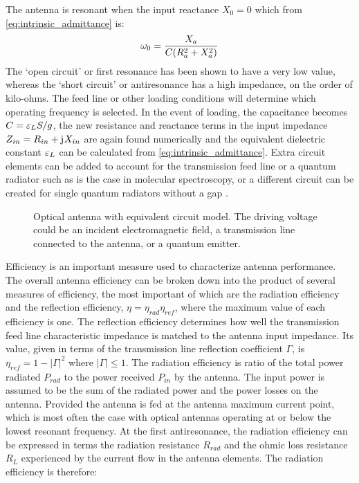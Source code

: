 \documentclass[11pt]{article}
\begin{document}
The antenna is resonant when the input reactance $X_0 = 0$ which from \eqref{eq:intrinsic_admittance} is:
%
\begin{equation}
  \omega_{0} = \frac{X_a}{C  (R_a^2 + X_a^2)}
  \label{eq:resonant_frequency_impedance}
\end{equation}
%
The `open circuit' or first resonance has been shown to have a very low value, whereas the `short circuit' or antiresonance has a high impedance, on the order of kilo-ohms. The feed line or other loading conditions will determine which operating frequency is selected. In the event of loading, the capacitance becomes $C = \varepsilon_L S /g$, the new resistance and reactance terms in the input impedance $Z_{in} = R_{in} + \mathrm{j}\mkern1mu X_{in}$ are again found numerically and the equivalent dielectric constant $\varepsilon_L$ can be calculated from \eqref{eq:intrinsic_admittance}. Extra circuit elements can be added to account for the transmission feed line or a quantum radiator such as is the case in molecular spectroscopy, or a different circuit can be created for single quantum radiators without a gap \cite{9781107014145}.
%
\begin{figure}[b!]
  \centering
  \def\svgwidth{.75\linewidth}
  
  \caption{Optical antenna with equivalent circuit model. The driving voltage could be an incident electromagnetic field, a transmission line connected to the antenna, or a quantum emitter.}
  \label{fig:alu_circuit}
\end{figure}
%
Efficiency is an important measure used to characterize antenna performance. The overall antenna efficiency can be broken down into the product of several measures of efficiency, the most important of which are the radiation efficiency and the reflection efficiency, $\eta  = \eta_{rad}\eta_{ref}$,
where the maximum value of each efficiency is one. The reflection efficiency determines how well the transmission feed line characteristic impedance is matched to the antenna input impedance. Its value, given in terms of the transmission line reflection coefficient $\Gamma$, is $\eta_{ref} = 1 - \left| \Gamma  \right|^2$ where $\left| \Gamma \right| \le 1$. The radiation efficiency is ratio of the total power radiated $P_{rad}$ to the power received $P_{in}$ by the antenna. The input power is assumed to be the sum of the radiated power and the power losses on the antenna. Provided the antenna is fed at the antenna maximum current point, which is most often the case with optical antennas operating at or below the lowest resonant frequency. At the first antiresonance, the radiation efficiency can be expressed in terms the radiation resistance $R_{rad}$ and the ohmic loss resistance $R_L$ experienced by the current flow in the antenna elements. The radiation efficiency is therefore:
\end{document}
